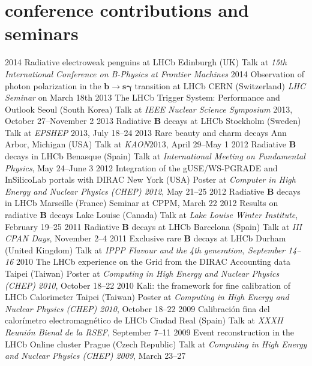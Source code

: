 {
\section{conference contributions and seminars}

    \cventry
        {2014}
        {Radiative electroweak penguins at LHCb}
        {Edinburgh (UK)}
        {Talk at \emph{15th International Conference on B-Physics at Frontier Machines}}
    \cventry
        {2014}
        {Observation of photon polarization in the $\mathbf{b\to s\gamma}$ transition at LHCb}
        {CERN (Switzerland)}
        {\emph{LHC Seminar} on March 18th}
    \cventry
        {2013}
        {The LHCb Trigger System: Performance and Outlook}
        {Seoul (South Korea)}
        {Talk at \emph{IEEE Nuclear Science Symposium} 2013, October 27--November 2}
    \cventry
        {2013}
        {Radiative $\mathbf{B}$ decays at LHCb}
        {Stockholm (Sweden)}
        {Talk at \emph{EPSHEP} $2013$, July 18--24}
    \cventry
        {2013}
        {Rare beauty and charm decays}
        {Ann Arbor, Michigan (USA)}
        {Talk at \emph{KAON}$2013$, April 29--May 1}
    \cventry
        {2012}
        {Radiative $\mathbf{B}$ decays in LHCb}
        {Benasque (Spain)}
        {Talk at \emph{International Meeting on Fundamental Physics}, May 24--June 3}
    \cventry
        {2012}
        {Integration of the gUSE/WS-PGRADE and InSilicoLab portals with DIRAC}
        {New York (USA)}
        {Poster at \emph{Computer in High Energy and Nuclear Physics (CHEP) 2012}, May 21--25}
    \cventry
        {2012}
        {Radiative $\mathbf{B}$ decays in LHCb}
        {Marseille (France)}
        {Seminar at CPPM, March 22}
    \cventry
        {2012}
        {Results on radiative $\mathbf{B}$ decays}
        {Lake Louise (Canada)}
        {Talk at \emph{Lake Louise Winter Institute}, February 19--25}
    \cventry
        {2011}
        {Radiative $\mathbf{B}$ decays at LHCb}
        {Barcelona (Spain)}
        {Talk at \emph{III CPAN Days}, November 2--4}
    \cventry
        {2011}
        {Exclusive rare $\mathbf{B}$ decays at LHCb}
        {Durham (United Kingdom)}
        {Talk at \emph{IPPP Flavour and the 4th generation, September 14--16}}
    \cventry
        {2010}
        {The LHCb experience on the Grid from the DIRAC Accounting data}
        {Taipei (Taiwan)}
        {Poster at \emph{Computing in High Energy and Nuclear Physics (CHEP) 2010}, October 18--22}
    \cventry
        {2010}
        {Kali: the framework for fine calibration of LHCb Calorimeter}
        {Taipei (Taiwan)}
        {Poster at \emph{Computing in High Energy and Nuclear Physics (CHEP) 2010}, October 18--22}
    \cventry
        {2009}
        {Calibraci\'{o}n fina del calor\'{i}metro electromagn\'{e}tico de LHCb}
        {Ciudad Real (Spain)}
        {Talk at \emph{XXXII Reuni\'{o}n Bienal de la RSEF}, September 7--11}
    \cventry
        {2009}
        {Event reconstruction in the LHCb Online cluster}
        {Prague (Czech Republic)}
        {Talk at \emph{Computing in High Energy and Nuclear Physics (CHEP) 2009}, March 23--27}
}{}

